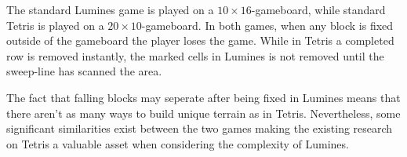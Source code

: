 The standard Lumines game is played on a $10 \times 16$-gameboard, while standard Tetris is played on a $20 \times 10$-gameboard. In both games, when any block is fixed outside of the gameboard the player loses the game. While in Tetris a completed row is removed instantly, the marked cells in Lumines is not removed until the sweep-line has scanned the area.

The fact that falling blocks may seperate after being fixed in Lumines means that there aren't as many ways to build unique terrain as in Tetris. Nevertheless, some significant similarities exist between the two games making the existing research on Tetris a valuable asset when considering the complexity of Lumines.
